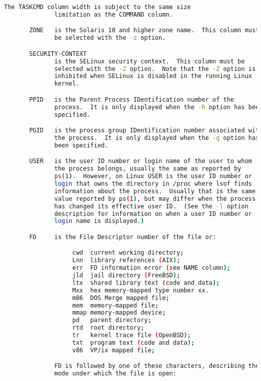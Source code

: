 {{\begin{lstlisting}[language=bash]
              The TASKCMD column width is subject to the same size
              limitation as the COMMAND column.

       ZONE   is the Solaris 10 and higher zone name.  This column must
              be selected with the -z option.

       SECURITY-CONTEXT
              is the SELinux security context.  This column must be
              selected with the -Z option.  Note that the -Z option is
              inhibited when SELinux is disabled in the running Linux
              kernel.

       PPID   is the Parent Process IDentification number of the
              process.  It is only displayed when the -R option has been
              specified.

       PGID   is the process group IDentification number associated with
              the process.  It is only displayed when the -g option has
              been specified.

       USER   is the user ID number or login name of the user to whom
              the process belongs, usually the same as reported by
              ps(1).  However, on Linux USER is the user ID number or
              login that owns the directory in /proc where lsof finds
              information about the process.  Usually that is the same
              value reported by ps(1), but may differ when the process
              has changed its effective user ID.  (See the -l option
              description for information on when a user ID number or
              login name is displayed.)

       FD     is the File Descriptor number of the file or:

                   cwd  current working directory;
                   Lnn  library references (AIX);
                   err  FD information error (see NAME column);
                   jld  jail directory (FreeBSD);
                   ltx  shared library text (code and data);
                   Mxx  hex memory-mapped type number xx.
                   m86  DOS Merge mapped file;
                   mem  memory-mapped file;
                   mmap memory-mapped device;
                   pd   parent directory;
                   rtd  root directory;
                   tr   kernel trace file (OpenBSD);
                   txt  program text (code and data);
                   v86  VP/ix mapped file;

              FD is followed by one of these characters, describing the
              mode under which the file is open:


\end{lstlisting}}}
